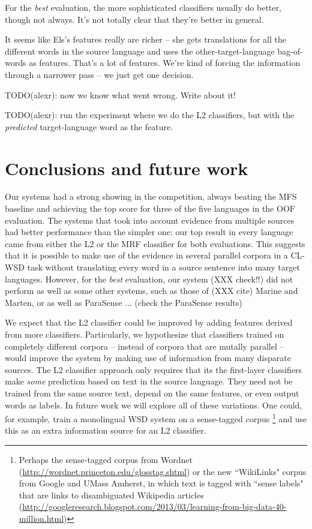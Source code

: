 \documentclass[11pt,letterpaper]{article}
\begin{document}
For the \emph{best} evaluation, the more sophisticated classifiers usually do
better, though not always. It's not totally clear that they're better in
general.

It seems like Els's features really are richer -- she gets translations for all
the different words in the source language and uses the other-target-language
bag-of-words as features. That's a lot of features. We're kind of forcing the
information through a narrower pass -- we just get one decision.

TODO(alexr): now we know what went wrong. Write about it!

TODO(alexr): run the experiment where we do the L2 classifiers, but with the
\emph{predicted} target-language word as the feature.

\section{Conclusions and future work}
Our systems had a strong showing in the competition, always beating the MFS
baseline and achieving the top score for three of the five languages in the OOF
evaluation. The systems that took into account evidence from multiple sources
had better performance than the simpler one: our top result in every language
came from either the L2 or the MRF classifier for both evaluations. This
suggests that it is possible to make use of the evidence in several parallel
corpora in a CL-WSD task without translating every word in a source sentence
into many target languages. However, for the \emph{best} evaluation, our system
(XXX check!!) did not perform as well as some other systems, such as those of
(XXX cite) Marine and Marten, or as well as ParaSense ... (check the ParaSense
results)


We expect that the L2 classifier could be improved by adding features derived
from more classifiers. Particularly, we hypothesize that classifiers trained on
completely different corpora -- instead of corpora that are mutally parallel --
would improve the system by making use of information from many disparate
sources. The L2 classifier approach only requires that its the first-layer
classifiers make \emph{some} prediction based on text in the source language.
They need not be trained from the same source text, depend on the same
features, or even output words as labels. In future work we will explore
all of these variations. One could, for example, train a monolingual WSD system
on a sense-tagged corpus \footnote{Perhaps the sense-tagged corpus from Wordnet
(\url{http://wordnet.princeton.edu/glosstag.shtml})
or the new ``WikiLinks" corpus from Google and UMass Amherst, in which text is
tagged with ``sense labels" that are links to disambiguated Wikipedia
articles
(\url{http://googleresearch.blogspot.com/2013/03/learning-from-big-data-40-million.html})}
and use this as an extra information source for an L2 classifier.
\end{document}
